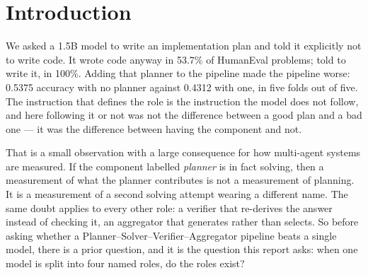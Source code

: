 \documentclass[11pt,a4paper]{article}
\begin{document}
\vfill
\newpage

\begin{abstract}
Multi-agent LLM systems have drawn growing interest because they let a task be divided across
roles such as planning, solving, verifying, and aggregating, on the expectation that the
resulting pipeline does better than a single model working alone. The value that coordination
itself adds is hard to assess, however. Reported comparisons differ in compute budget, in which
model serves as the control, and in how wide an effect they claim. In this report we build one
experimental framework over reasoning and coding benchmarks and use it to study three questions:
how much each role contributes, what happens when one model's solution is passed to another, and
whether a model can be trained to carry out its assigned role. We find that most of the reported
benefit shrinks or disappears once the comparison is made on equal terms. In particular, an
incorrect solution from a weak model can sharply reduce the accuracy of a strong model that reads
it, while an objective verification signal is more reliable than asking a model to judge its own
output. Taken together, the measurements suggest that multi-agent coordination does not produce a
benefit by default. Whether it helps depends on the capability of the models involved, on how
information is routed between them, and on the mechanism used to select and verify candidate
solutions.
\end{abstract}

\section{Introduction}\label{sec:intro}

We asked a 1.5B model to write an implementation plan and told it explicitly not to write code. It wrote code anyway in 53.7\% of HumanEval problems; told to write it, in 100\%. Adding that planner to the pipeline made the pipeline worse: 0.5375 accuracy with no planner against 0.4312 with one, in five folds out of five. The instruction that defines the role is the instruction the model does not follow, and here following it or not was not the difference between a good plan and a bad one --- it was the difference between having the component and not.

That is a small observation with a large consequence for how multi-agent systems are measured. If the component labelled \emph{planner} is in fact solving, then a measurement of what the planner contributes is not a measurement of planning. It is a measurement of a second solving attempt wearing a different name. The same doubt applies to every other role: a verifier that re-derives the answer instead of checking it, an aggregator that generates rather than selects. So before asking whether a Planner--Solver--Verifier--Aggregator pipeline beats a single model, there is a prior question, and it is the question this report asks: when one model is split into four named roles, do the roles exist?
\end{document}
